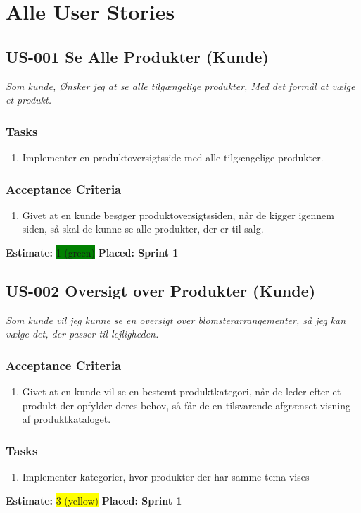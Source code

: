 \section{Alle User Stories}
\label{sec:all-user-stories}

\subsection{US-001 Se Alle Produkter (Kunde)}
\label{sec:US-001}
\textit{Som kunde, Ønsker jeg at se alle tilgængelige produkter, Med det formål at vælge et produkt.}
\subsubsection*{\textbf{Tasks}}
\begin{enumerate}
  \item Implementer en produktoversigtsside med alle tilgængelige produkter.
\end{enumerate}
\subsubsection*{\textbf{Acceptance Criteria}}
\begin{enumerate}
  \item Givet at en kunde besøger produktoversigtssiden, når de kigger igennem siden, så skal de kunne se alle produkter, der er til salg.
\end{enumerate}
\textbf{Estimate:} \colorbox{green}{1 (green)}
\textbf{Placed: Sprint 1}
\par\noindent\dotfill

\subsection{US-002 Oversigt over Produkter (Kunde)}
\label{sec:US-002}
\textit{Som kunde vil jeg kunne se en oversigt over blomsterarrangementer, så jeg kan vælge det, der passer til lejligheden.}
\subsubsection*{\textbf{Acceptance Criteria}}
\begin{enumerate}
  \item Givet at en kunde vil se en bestemt produktkategori, når de leder efter et produkt der opfylder deres behov, så får de en tilsvarende afgrænset visning af produktkataloget.
\end{enumerate}
\subsubsection*{\textbf{Tasks}}
\begin{enumerate}
  \item Implementer kategorier, hvor produkter der har samme tema vises
\end{enumerate}
\textbf{Estimate:} \colorbox{yellow}{3 (yellow)}
\textbf{Placed: Sprint 1}
\par\noindent\dotfill

